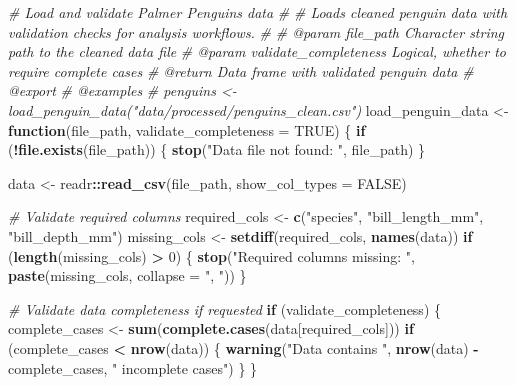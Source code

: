 \documentclass[
]{article}
\newenvironment{Shaded}{\begin{snugshade}}{\end{snugshade}}
\newcommand{\AttributeTok}[1]{\textcolor[rgb]{0.13,0.29,0.53}{#1}}
\newcommand{\CommentTok}[1]{\textcolor[rgb]{0.56,0.35,0.01}{\textit{#1}}}
\newcommand{\ConstantTok}[1]{\textcolor[rgb]{0.56,0.35,0.01}{#1}}
\newcommand{\ControlFlowTok}[1]{\textcolor[rgb]{0.13,0.29,0.53}{\textbf{#1}}}
\newcommand{\DecValTok}[1]{\textcolor[rgb]{0.00,0.00,0.81}{#1}}
\newcommand{\FunctionTok}[1]{\textcolor[rgb]{0.13,0.29,0.53}{\textbf{#1}}}
\newcommand{\NormalTok}[1]{#1}
\newcommand{\OtherTok}[1]{\textcolor[rgb]{0.56,0.35,0.01}{#1}}
\newcommand{\SpecialCharTok}[1]{\textcolor[rgb]{0.81,0.36,0.00}{\textbf{#1}}}
\newcommand{\StringTok}[1]{\textcolor[rgb]{0.31,0.60,0.02}{#1}}
\begin{document}
\begin{Shaded}
\begin{Highlighting}[]
\CommentTok{\#\textquotesingle{} Load and validate Palmer Penguins data}
\CommentTok{\#\textquotesingle{}}
\CommentTok{\#\textquotesingle{} Loads cleaned penguin data with validation checks for analysis workflows.}
\CommentTok{\#\textquotesingle{}}
\CommentTok{\#\textquotesingle{} @param file\_path Character string path to the cleaned data file}
\CommentTok{\#\textquotesingle{} @param validate\_completeness Logical, whether to require complete cases}
\CommentTok{\#\textquotesingle{} @return Data frame with validated penguin data}
\CommentTok{\#\textquotesingle{} @export}
\CommentTok{\#\textquotesingle{} @examples}
\CommentTok{\#\textquotesingle{} penguins \textless{}{-} load\_penguin\_data("data/processed/penguins\_clean.csv")}
\NormalTok{load\_penguin\_data }\OtherTok{\textless{}{-}} \ControlFlowTok{function}\NormalTok{(file\_path, }\AttributeTok{validate\_completeness =} \ConstantTok{TRUE}\NormalTok{) \{}
  \ControlFlowTok{if}\NormalTok{ (}\SpecialCharTok{!}\FunctionTok{file.exists}\NormalTok{(file\_path)) \{}
    \FunctionTok{stop}\NormalTok{(}\StringTok{"Data file not found: "}\NormalTok{, file\_path)}
\NormalTok{  \}}

\NormalTok{  data }\OtherTok{\textless{}{-}}\NormalTok{ readr}\SpecialCharTok{::}\FunctionTok{read\_csv}\NormalTok{(file\_path, }\AttributeTok{show\_col\_types =} \ConstantTok{FALSE}\NormalTok{)}

  \CommentTok{\# Validate required columns}
\NormalTok{  required\_cols }\OtherTok{\textless{}{-}} \FunctionTok{c}\NormalTok{(}\StringTok{"species"}\NormalTok{, }\StringTok{"bill\_length\_mm"}\NormalTok{, }\StringTok{"bill\_depth\_mm"}\NormalTok{)}
\NormalTok{  missing\_cols }\OtherTok{\textless{}{-}} \FunctionTok{setdiff}\NormalTok{(required\_cols, }\FunctionTok{names}\NormalTok{(data))}
  \ControlFlowTok{if}\NormalTok{ (}\FunctionTok{length}\NormalTok{(missing\_cols) }\SpecialCharTok{\textgreater{}} \DecValTok{0}\NormalTok{) \{}
    \FunctionTok{stop}\NormalTok{(}\StringTok{"Required columns missing: "}\NormalTok{, }\FunctionTok{paste}\NormalTok{(missing\_cols, }\AttributeTok{collapse =} \StringTok{", "}\NormalTok{))}
\NormalTok{  \}}

  \CommentTok{\# Validate data completeness if requested}
  \ControlFlowTok{if}\NormalTok{ (validate\_completeness) \{}
\NormalTok{    complete\_cases }\OtherTok{\textless{}{-}} \FunctionTok{sum}\NormalTok{(}\FunctionTok{complete.cases}\NormalTok{(data[required\_cols]))}
    \ControlFlowTok{if}\NormalTok{ (complete\_cases }\SpecialCharTok{\textless{}} \FunctionTok{nrow}\NormalTok{(data)) \{}
      \FunctionTok{warning}\NormalTok{(}\StringTok{"Data contains "}\NormalTok{, }\FunctionTok{nrow}\NormalTok{(data) }\SpecialCharTok{{-}}\NormalTok{ complete\_cases, }\StringTok{" incomplete cases"}\NormalTok{)}
\NormalTok{    \}}
\NormalTok{  \}}


\end{Highlighting}
\end{Shaded}
\end{document}

